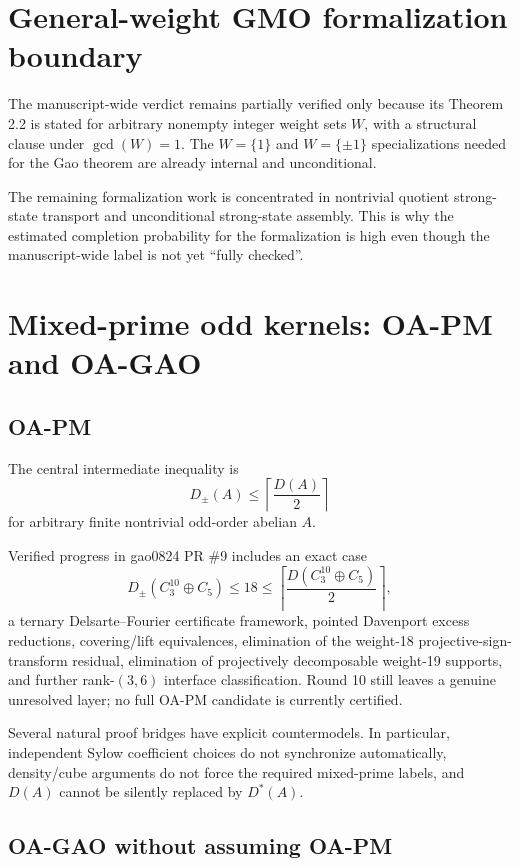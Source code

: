 \documentclass[11pt,a4paper]{ctexart}
\begin{document}
\section{General-weight GMO formalization boundary}

The manuscript-wide verdict remains partially verified only because its Theorem 2.2 is stated for arbitrary nonempty integer weight sets $W$, with a structural clause under $\gcd(W)=1$. The $W=\{1\}$ and $W=\{\pm1\}$ specializations needed for the Gao theorem are already internal and unconditional.

The remaining formalization work is concentrated in nontrivial quotient strong-state transport and unconditional strong-state assembly. This is why the estimated completion probability for the formalization is high even though the manuscript-wide label is not yet ``fully checked''.

\section{Mixed-prime odd kernels: OA-PM and OA-GAO}

\subsection{OA-PM}

The central intermediate inequality is
\[
D_{\pm}(A)\le\left\lceil\frac{D(A)}2\right\rceil
\]
for arbitrary finite nontrivial odd-order abelian $A$.

Verified progress in gao0824 PR \#9 includes an exact case
\[
D_{\pm}(C_3^{10}\oplus C_5)\le18
\le\left\lceil\frac{D(C_3^{10}\oplus C_5)}2\right\rceil,
\]
a ternary Delsarte--Fourier certificate framework, pointed Davenport excess reductions, covering/lift equivalences, elimination of the weight-18 projective-sign-transform residual, elimination of projectively decomposable weight-19 supports, and further rank-$(3,6)$ interface classification. Round 10 still leaves a genuine unresolved layer; no full OA-PM candidate is currently certified.

Several natural proof bridges have explicit countermodels. In particular, independent Sylow coefficient choices do not synchronize automatically, density/cube arguments do not force the required mixed-prime labels, and $D(A)$ cannot be silently replaced by $D^*(A)$.

\subsection{OA-GAO without assuming OA-PM}
\end{document}
